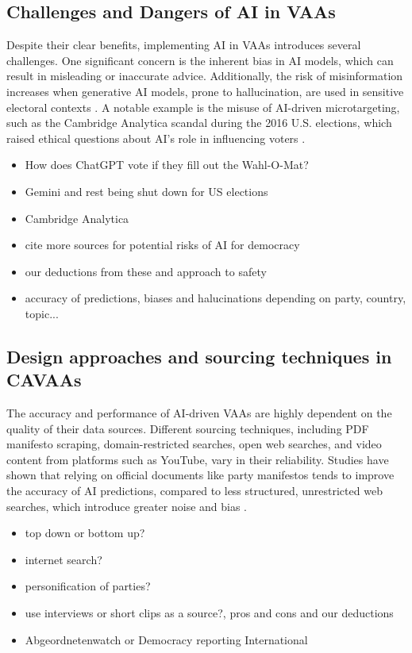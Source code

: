 \documentclass{article}
\begin{document}
\subsection{Challenges and Dangers of AI in VAAs}

Despite their clear benefits, implementing AI in VAAs introduces several challenges. One significant concern is the inherent bias in AI models, which can result in misleading or inaccurate advice. Additionally, the risk of misinformation increases when generative AI models, prone to hallucination, are used in sensitive electoral contexts \cite{bueno2023}. A notable example is the misuse of AI-driven microtargeting, such as the Cambridge Analytica scandal during the 2016 U.S. elections, which raised ethical questions about AI's role in influencing voters \cite{brand2024}.

\begin{itemize}
    \item How does ChatGPT vote if they fill out the Wahl-O-Mat?
    \item Gemini and rest being shut down for US elections
    \item Cambridge Analytica
    \item cite more sources for potential risks of AI for democracy
    \item our deductions from these and approach to safety 
    \item accuracy of predictions, biases and halucinations depending on party, country, topic...
\end{itemize}

\subsection{Design approaches and sourcing techniques in CAVAAs}

The accuracy and performance of AI-driven VAAs are highly dependent on the quality of their data sources. Different sourcing techniques, including PDF manifesto scraping, domain-restricted searches, open web searches, and video content from platforms such as YouTube, vary in their reliability. Studies have shown that relying on official documents like party manifestos tends to improve the accuracy of AI predictions, compared to less structured, unrestricted web searches, which introduce greater noise and bias \cite{bueno2023}. 



\begin{itemize}
    \item top down or bottom up?
    \item internet search?
    \item personification of parties?
    \item use interviews or short clips as a source?, pros and cons and our deductions
    \item Abgeordnetenwatch or Democracy reporting International
\end{itemize}
\end{document}
